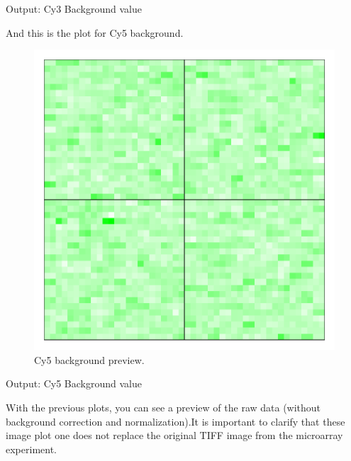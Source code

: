 \documentclass[12pt]{article}
\begin{document}
\begin{Soutput}
Output: Cy3 Background value
\end{Soutput}
And this is the plot for Cy5 background.
\begin{figure}[h]
\begin{center}
\includegraphics{example-genArise-005}
\caption{Cy5 background preview. \label{fig3}}	
\end{center}
\end{figure}

\begin{Soutput}
Output: Cy5 Background value
\end{Soutput}
With the previous plots, you can see a preview of the raw data (without background correction and normalization).It is important to clarify that these image plot one does not replace the original TIFF image from the microarray experiment.\\
\end{document}
